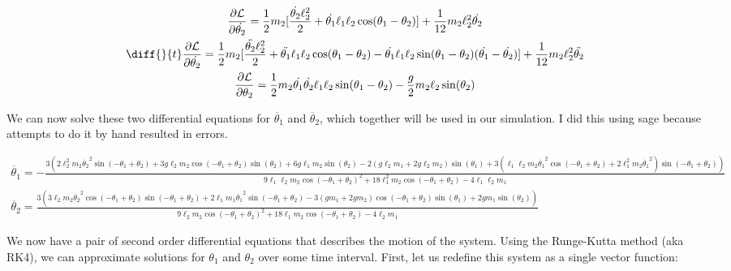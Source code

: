 \documentclass[]{article}
\begin{document}
\begin{gather*}
	\frac{\partial \lagr}{\partial \dot{\theta_2}} = \frac12m_2[\frac{\dot{\theta_2}\ell_2^2}{2} + \dot{\theta_1}\ell_1\ell_2\cos(\theta_1 - \theta_2)] + \frac{1}{12}m_2\ell_2^2\dot{\theta_2} \\
	\diff{}{t}\frac{\partial \lagr}{\partial \dot{\theta_2}} = \frac12m_2[\frac{\ddot{\theta_2}\ell_2^2}{2} + \ddot{\theta_1}\ell_1\ell_2\cos(\theta_1 - \theta_2) - \dot{\theta_1}\ell_1\ell_2\sin(\theta_1 - \theta_2)(\dot{\theta_1} - \dot{\theta_2})] + \frac{1}{12}m_2\ell_2^2\ddot{\theta_2} \\
	\frac{\partial \lagr}{\partial \theta_2} = \frac12m_2\dot{\theta_1}\dot{\theta_2}\ell_1\ell_2\sin(\theta_1 - \theta_2) - \frac{g}{2}m_2\ell_2\sin(\theta_2)
\end{gather*}

We can now solve these two differential equations for $\ddot{\theta_1}$ and $\ddot{\theta_2}$, which together will be used in our simulation. I did this using sage because attempts to do it by hand resulted in errors.

\begin{gather*}
	\ddot{\theta_1} = -\frac{3(2  \ell_2^2 m_2 {\dot{\theta_2}}^2 \sin(-\theta_1 + \theta_2) + 3  g \ell_2 m_2 \cos(-\theta_1 + \theta_2) \sin(\theta_2) + 6  g \ell_1 m_2 \sin(\theta_2) - 2  {(g \ell_2 m_1 + 2  g \ell_2 m_2)} \sin(\theta_1) + 3  {(\ell_1 \ell_2 m_2 {\dot{\theta_1}}^2 \cos(-\theta_1 + \theta_2) + 2  \ell_1^2 m_2 {\dot{\theta_1}}^2)} \sin(-\theta_1 + \theta_2))}{9  \ell_1 \ell_2 m_2 \cos(-\theta_1 + \theta_2)^2 + 18  \ell_1^2 m_2 \cos(-\theta_1 + \theta_2) - 4  \ell_1 \ell_2 m_1}
	\\
	\ddot{\theta_2} = \frac{3(3  \ell_2 m_2 {\dot{\theta_2}}^2 \cos(-\theta_1 + \theta_2) \sin(-\theta_1 + \theta_2) + 2  \ell_1 m_1 {\dot{\theta_1}}^2 \sin(-\theta_1 + \theta_2) - 3  {(g m_1 + 2  g m_2)} \cos(-\theta_1 + \theta_2) \sin(\theta_1) + 2  g m_1 \sin(\theta_2))}{9  \ell_2 m_2 \cos(-\theta_1 + \theta_2)^2 + 18  \ell_1 m_2 \cos(-\theta_1 + \theta_2) - 4  \ell_2 m_1}
\end{gather*}

We now have a pair of second order differential equations that describes the motion of the system. Using the Runge-Kutta method (aka RK4), we can approximate solutions for $\theta_1$ and $\theta_2$ over some time interval. First, let us redefine this system as a single vector function:
\end{document}
